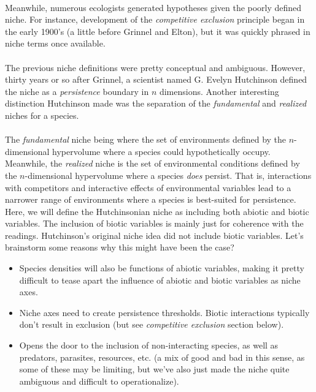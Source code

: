 \documentclass[12pt]{article}
\begin{document}
\paragraph*{}
Meanwhile, numerous ecologists generated hypotheses given the poorly defined niche. For instance, development of the \textit{competitive exclusion} principle began in the early 1900's (a little before Grinnel and Elton), but it was quickly phrased in niche terms once available. 


\paragraph*{}
The previous niche definitions were pretty conceptual and ambiguous. However, thirty years or so after Grinnel, a scientist named G. Evelyn Hutchinson defined the niche as a \textit{persistence} boundary in $n$ dimensions. Another interesting distinction Hutchinson made was the separation of the \textit{fundamental} and \textit{realized} niches for a species. 


\paragraph*{}
The \textit{fundamental} niche being where the set of environments defined by the $n$-dimensional hypervolume where a species could hypothetically occupy. Meanwhile, the \textit{realized} niche is the set of environmental conditions defined by the $n$-dimensional hypervolume where a species \textit{does} persist. That is, interactions with competitors and interactive effects of environmental variables lead to a narrower range of environments where a species is best-suited for persistence. Here, we will define the Hutchinsonian niche as including both abiotic and biotic variables. The inclusion of biotic variables is mainly just for coherence with the readings. Hutchinson's original niche idea did not include biotic variables. Let's brainstorm some reasons why this might have been the case?


\begin{itemize}
  \item Species densities will also be functions of abiotic variables, making it pretty difficult to tease apart the influence of abiotic and biotic variables as niche axes. 
  \item Niche axes need to create persistence thresholds. Biotic interactions typically don't result in exclusion (but see \textit{competitive exclusion} section below). 
  \item Opens the door to the inclusion of non-interacting species, as well as predators, parasites, resources, etc. (a mix of good and bad in this sense, as some of these may be limiting, but we've also just made the niche quite ambiguous and difficult to operationalize).
\end{itemize}
\end{document}
